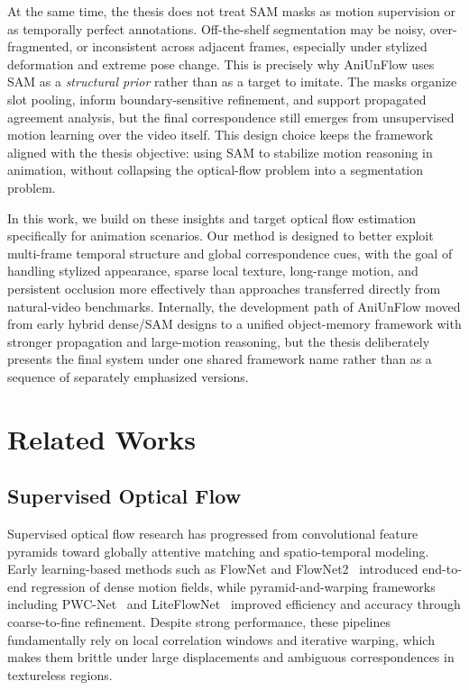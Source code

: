 At the same time, the thesis does not treat SAM masks as motion supervision or as temporally perfect annotations. Off-the-shelf segmentation may be noisy, over-fragmented, or inconsistent across adjacent frames, especially under stylized deformation and extreme pose change. This is precisely why AniUnFlow uses SAM as a \emph{structural prior} rather than as a target to imitate. The masks organize slot pooling, inform boundary-sensitive refinement, and support propagated agreement analysis, but the final correspondence still emerges from unsupervised motion learning over the video itself. This design choice keeps the framework aligned with the thesis objective: using SAM to stabilize motion reasoning in animation, without collapsing the optical-flow problem into a segmentation problem.

In this work, we build on these insights and target optical flow estimation specifically for animation scenarios. Our method is designed to better exploit multi-frame temporal structure and global correspondence cues, with the goal of handling stylized appearance, sparse local texture, long-range motion, and persistent occlusion more effectively than approaches transferred directly from natural-video benchmarks. Internally, the development path of AniUnFlow moved from early hybrid dense/SAM designs to a unified object-memory framework with stronger propagation and large-motion reasoning, but the thesis deliberately presents the final system under one shared framework name rather than as a sequence of separately emphasized versions.


\section{Related Works}
\subsection{Supervised Optical Flow}
Supervised optical flow research has progressed from convolutional feature pyramids
toward globally attentive matching and spatio-temporal modeling. Early learning-based
methods such as FlowNet and FlowNet2~\cite{dosovitskiy2015flownet,ilg2017flownet2}
introduced end-to-end regression of dense motion fields, while pyramid-and-warping
frameworks including PWC-Net~\cite{pwcnet} and LiteFlowNet~\cite{hui2018liteflownet}
improved efficiency and accuracy through coarse-to-fine refinement. Despite strong
performance, these pipelines fundamentally rely on local correlation windows and
iterative warping, which makes them brittle under large displacements and ambiguous
correspondences in textureless regions.

